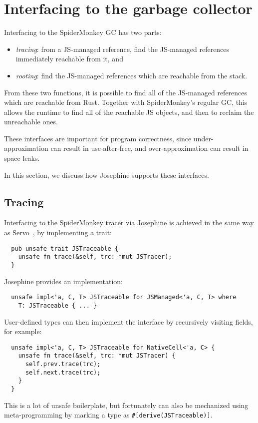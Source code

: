 \section{Interfacing to the garbage collector}

Interfacing to the SpiderMonkey GC has two parts:
\begin{itemize}

\item \emph{tracing}: from a JS-managed reference, find
  the JS-managed references immediately reachable from it, and

\item \emph{rooting}: find the JS-managed references which
  are reachable from the stack.

\end{itemize}
From these two functions, it is possible to find all of the
JS-managed references which are reachable from Rust. Together
with SpiderMonkey's regular GC, this allows the runtime to
find all of the reachable JS objects, and then to reclaim the
unreachable ones.

These interfaces are important for program correctness, since
under-approximation can result in use-after-free,
and over-approximation can result in space leaks.

In this section, we discuss how Josephine supports these interfaces.

\subsection{Tracing}
\label{sec:tracing}

Interfacing to the SpiderMonkey tracer via Josephine is achieved
in the same way as Servo~\cite{servo},
by implementing a trait:
\begin{verbatim}
  pub unsafe trait JSTraceable {
    unsafe fn trace(&self, trc: *mut JSTracer);
  }
\end{verbatim}
Josephine provides an implementation:
\begin{verbatim}
  unsafe impl<'a, C, T> JSTraceable for JSManaged<'a, C, T> where
    T: JSTraceable { ... }
\end{verbatim}
User-defined types can then implement the interface by
recursively visiting fields, for example:
\begin{verbatim}
  unsafe impl<'a, C, T> JSTraceable for NativeCell<'a, C> {
    unsafe fn trace(&self, trc: *mut JSTracer) {
      self.prev.trace(trc);
      self.next.trace(trc);
    }
  }
\end{verbatim}
This is a lot of unsafe boilerplate, but fortunately can
also be mechanized using meta-programming by marking a type
as \verb|#[derive(JSTraceable)]|.

